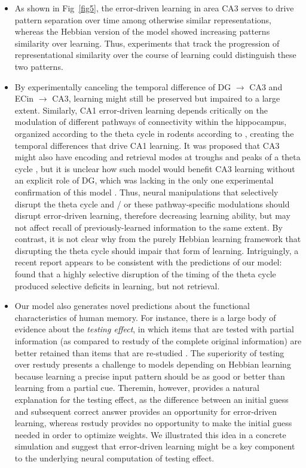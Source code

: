 \documentclass[10pt,letterpaper]{article}
\begin{document}
\begin{itemize}
    \item As shown in Fig~\ref{fig5}, the error-driven learning in area CA3 serves to drive pattern separation over time among otherwise similar representations, whereas the Hebbian version of the model showed increasing patterns similarity over learning.  Thus, experiments that track the progression of representational similarity over the course of learning could distinguish these two patterns.

    \item By experimentally canceling the temporal difference of DG $\rightarrow$ CA3 and ECin $\rightarrow$ CA3, learning might still be preserved but impaired to a large extent.  Similarly, CA1 error-driven learning \cite{KetzMorkondaOReilly13} depends critically on the modulation of different pathways of connectivity within the hippocampus, organized according to the theta cycle in rodents according to \cite{HasselmoBodelonWyble02}, creating the temporal differences that drive CA1 learning.  It was proposed that CA3 might also have encoding and retrieval modes at troughs and peaks of a theta cycle \cite{KunecHasselmoKopell05}, but it is unclear how such model would benefit CA3 learning without an explicit role of DG, which was lacking in the only one experimental confirmation of this model \cite{VillarrealGrossDerrick07}.  Thus, neural manipulations that selectively disrupt the theta cycle and / or these pathway-specific modulations should disrupt error-driven learning, therefore decreasing learning ability, but may not affect recall of previously-learned information to the same extent.  By contrast, it is not clear why from the purely Hebbian learning framework that disrupting the theta cycle should impair that form of learning.  Intriguingly, a recent report appears to be consistent with the predictions of our model: \cite{QuirkZutshiSrikanthEtAl21} found that a highly selective disruption of the timing of the theta cycle produced selective deficits in learning, but not retrieval.

    \item Our model also generates novel predictions about the functional characteristics of human memory. For instance, there is a large body of evidence about the \emph{testing effect}, in which items that are tested with partial information (as compared to restudy of the complete original information) are better retained than items that are re-studied  \cite{LiuOReillyRanganath21}.  The superiority of testing over restudy presents a challenge to models depending on Hebbian learning because learning a precise input pattern should be as good or better than learning from a partial cue. Theremin, however, provides a natural explanation for the testing effect, as the difference between an initial guess and subsequent correct answer provides an opportunity for error-driven learning, whereas restudy provides no opportunity to make the initial guess needed in order to optimize weights.  We illustrated this idea in a concrete simulation and suggest that error-driven learning might be a key component to the underlying neural computation of testing effect.
    
\end{itemize}
\end{document}
